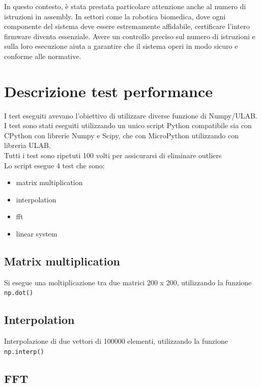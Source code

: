 \documentclass[12pt,a4paper]{report}
\begin{document}
In questo contesto, è stata prestata particolare attenzione anche al numero di istruzioni in assembly. In settori come la robotica biomedica, dove ogni componente del sistema deve essere estremamente affidabile, certificare l'intero firmware diventa essenziale. Avere un controllo preciso sul numero di istruzioni e sulla loro esecuzione aiuta a garantire che il sistema operi in modo sicuro e conforme alle normative.


\section{Descrizione test performance}\label{descrizione-test-performance}

I test eseguiti avevano l'obiettivo di utilizzare
diverse funzione di Numpy/ULAB.\\
I test sono stati eseguiti utilizzando un unico script Python
compatibile sia con CPython con librerie Numpy e Scipy, che con
MicroPython utilizzando con libreria ULAB.\\
Tutti i test sono ripetuti 100 volti per assicurarsi di eliminare
outliers\\
Lo script esegue 4 test che sono:

\begin{itemize}
\item
  matrix multiplication
\item
  interpolation
\item
  fft
\item
  linear system
\end{itemize}

\subsection{Matrix multiplication}\label{matrix-multiplication}

Si esegue una moltiplicazione tra due matrici 200 x 200, utilizzando la
funzione \texttt{np.dot()}

\subsection{Interpolation}\label{interpolation}

Interpolazione di due vettori di 100000 elementi, utilizzando la
funzione \texttt{np.interp()}

\subsection{FFT}\label{fft}
\end{document}
